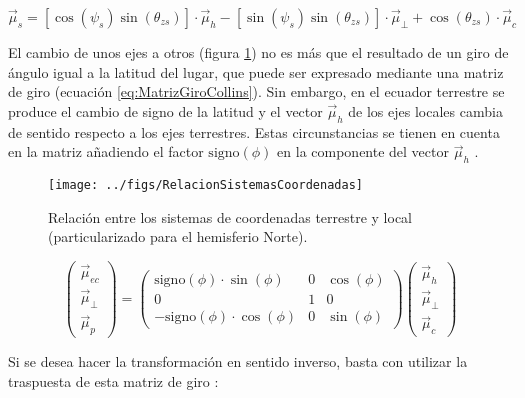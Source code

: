 \begin{equation}
\vec{\mu}_{s}=\left[\cos\left(\psi_{s}\right)\sin\left(\theta_{zs}\right)\right]\cdot\vec{\mu}_{h}-\left[\sin\left(\psi_{s}\right)\sin\left(\theta_{zs}\right)\right]\cdot\vec{\mu}_{\bot}+\cos\left(\theta_{zs}\right)\cdot\vec{\mu}_{c}\label{VectorSolarLocales}\end{equation}


El cambio de unos ejes a otros (figura \ref{fig:RelacionSistemasCoordenadas})
no es más que el resultado de un giro de ángulo igual a la latitud
del lugar, que puede ser expresado mediante una matriz de giro (ecuación
\ref{eq:MatrizGiroCollins})\cite{CollinsII2004}. Sin embargo, en
el ecuador terrestre se produce el cambio de signo de la latitud y
el vector $\vec{\mu}_{h}$ de los ejes locales cambia de sentido respecto
a los ejes terrestres. Estas circunstancias se tienen en cuenta en
la matriz añadiendo el factor $\mathrm{signo}(\phi)$ en la componente
del vector $\vec{\mu}_{h}$ .

%
\begin{figure}
\texttt{[image: ../figs/RelacionSistemasCoordenadas]}

\caption{Relación entre los sistemas de coordenadas terrestre y local (particularizado
para el hemisferio Norte).\label{fig:RelacionSistemasCoordenadas}}

\end{figure}


\begin{equation}
\left(\begin{array}{c}
\vec{\mu}_{ec}\\
\vec{\mu}_{\bot}\\
\vec{\mu}_{p}\end{array}\right)=\left(\begin{array}{ccc}
\mathrm{signo}(\phi)\cdot\sin(\phi) & 0 & \cos(\phi)\\
0 & 1 & 0\\
-\mathrm{signo}(\phi)\cdot\cos(\phi) & 0 & \sin(\phi)\end{array}\right)\left(\begin{array}{c}
\vec{\mu}_{h}\\
\vec{\mu}_{\bot}\\
\vec{\mu}_{c}\end{array}\right)\label{eq:MatrizGiroCollins}\end{equation}


Si se desea hacer la transformación en sentido inverso, basta con
utilizar la traspuesta de esta matriz de giro :

